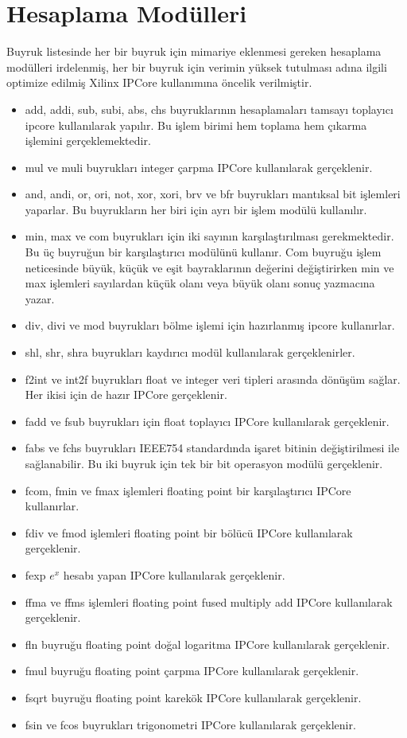 \section{Hesaplama Modülleri}
Buyruk listesinde her bir buyruk için mimariye eklenmesi gereken hesaplama modülleri irdelenmiş, her bir buyruk için verimin yüksek tutulması adına ilgili optimize edilmiş Xilinx IPCore kullanımına öncelik verilmiştir.\par
\begin{itemize}
\item add, addi, sub, subi, abs, chs buyruklarının hesaplamaları tamsayı toplayıcı ipcore kullanılarak yapılır. Bu işlem birimi hem toplama hem çıkarma işlemini gerçeklemektedir.
\item mul ve muli buyrukları integer çarpma IPCore kullanılarak gerçeklenir.
\item and, andi, or, ori, not, xor, xori, brv ve bfr buyrukları mantıksal bit işlemleri yaparlar. Bu buyrukların her biri için ayrı bir işlem modülü kullanılır.
\item min, max ve com buyrukları için iki sayının karşılaştırılması gerekmektedir. Bu üç buyruğun bir karşılaştırıcı modülünü kullanır. Com buyruğu işlem neticesinde büyük, küçük ve eşit bayraklarının değerini değiştirirken min ve max işlemleri sayılardan küçük olanı veya büyük olanı sonuç yazmacına yazar. 
\item div, divi ve mod buyrukları bölme işlemi için hazırlanmış ipcore kullanırlar.  
\item shl, shr, shra buyrukları kaydırıcı modül kullanılarak gerçeklenirler.
\item f2int ve int2f buyrukları float ve integer veri tipleri arasında dönüşüm sağlar. Her ikisi için de hazır IPCore gerçeklenir.
\item fadd ve fsub buyrukları için float toplayıcı IPCore kullanılarak gerçeklenir.
\item fabs ve fchs buyrukları IEEE754 standardında işaret bitinin değiştirilmesi ile sağlanabilir. Bu iki buyruk için tek bir bit operasyon modülü gerçeklenir.
\item fcom, fmin ve fmax işlemleri floating point bir karşılaştırıcı IPCore kullanırlar.
\item fdiv ve fmod işlemleri floating point bir bölücü IPCore kullanılarak gerçeklenir.
\item fexp  $e^{x}$ hesabı yapan IPCore kullanılarak gerçeklenir.
\item ffma ve ffms işlemleri floating point fused multiply add IPCore kullanılarak gerçeklenir.
\item fln buyruğu floating point doğal logaritma IPCore kullanılarak gerçeklenir.
\item fmul buyruğu floating point çarpma IPCore kullanılarak gerçeklenir.
\item fsqrt buyruğu floating point karekök IPCore kullanılarak gerçeklenir.
\item fsin ve fcos buyrukları trigonometri IPCore kullanılarak gerçeklenir.
\end{itemize}

